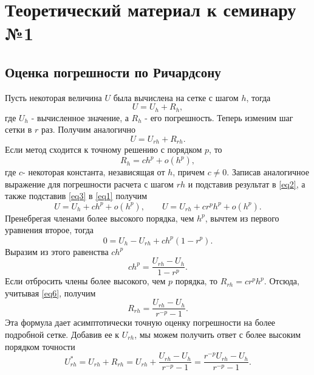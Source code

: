 \section{Теоретический материал к семинару №1}

\subsection{Оценка погрешности по Ричардсону}
Пусть некоторая величина $U$ была вычислена на сетке с шагом $h$, тогда
\begin{equation} \label{eq1}
U = U_h + R_h,
\end{equation}
где $U_h$ - вычисленное значение, а $R_h$ - его погрешность. Теперь изменим шаг сетки в $r$ раз. Получим аналогично
\begin{equation} \label{eq2}
U = U_{rh} + R_{rh}.
\end{equation}
Если метод сходится к точному решению с порядком $p$, то
\begin{equation} \label{eq3}
R_h = ch^p + o(h^p),
\end{equation}
где $c$- некоторая константа, независящая от $h$, причем $c \neq 0$.
Записав аналогичное выражение для погрешности расчета с шагом $rh$ и подставив результат в \eqref{eq2}, а также подставив \eqref{eq3} в \eqref{eq1} получим
\begin{equation} \label{eq4}
U = U_h + ch^p + o(h^p),
\qquad 
U = U_{rh} + cr^ph^p + o(h^p).
\end{equation}
Пренебрегая членами более высокого порядка, чем $h^p$, вычтем из первого уравнения второе, тогда
\begin{equation} \label{eq5}
0 = U_h - U_{rh} + ch^p(1-r^p).
\end{equation}
Выразим из этого равенства $ch^p$
\begin{equation} \label{eq6}
ch^p = \frac{U_{rh} - U_h}{1 - r^p}.
\end{equation}
Если отбросить члены более высокого, чем $p$ порядка, то $R_{rh} = cr^ph^p$. Отсюда, учитывая \eqref{eq6}, получим
\begin{equation} \label{eq7}
R_{rh} = \frac{U_{rh} - U_h}{r^{-p} - 1}.
\end{equation}
Эта формула дает асимптотически точную оценку погрешности на более подробной сетке. Добавив ее к $U_{rh}$, мы можем получить ответ с более высоким порядком точности
\begin{equation} \label{eq8}
U_{rh}^* = U_{rh} + R_{rh} = U_{rh} + \frac{U_{rh} - U_h}{r^{-p} - 1} = \frac{r^{-p}U_{rh} - U_h}{r^{-p} - 1}.
\end{equation}

